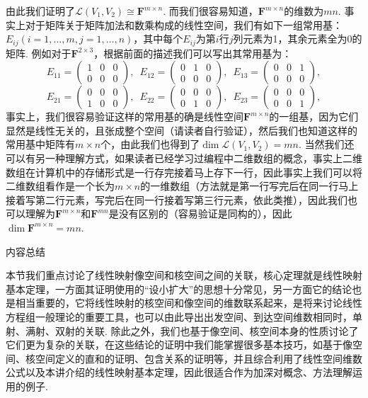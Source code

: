 由此我们证明了$\mathcal{L}(V_1,V_2)\cong\mathbf{F}^{m\times n}$. 而我们很容易知道，$\mathbf{F}^{m\times n}$的维数为$mn$. 事实上对于矩阵关于矩阵加法和数乘构成的线性空间，我们有如下一组常用基：$E_{ij}(i=1,\ldots,m,j=1,\ldots,n)$，其中每个$E_{ij}$为第$i$行$j$列元素为1，其余元素全为0的矩阵. 例如对于$\mathbf{F}^{2\times 3}$，根据前面的描述我们可以写出其常用基为：
\[E_{11}=\begin{pmatrix}
        1 & 0 & 0 \\
        0 & 0 & 0
    \end{pmatrix},\enspace E_{12}=\begin{pmatrix}
        0 & 1 & 0 \\
        0 & 0 & 0
    \end{pmatrix},\enspace E_{13}=\begin{pmatrix}
        0 & 0 & 1 \\
        0 & 0 & 0
    \end{pmatrix},\]
\[E_{21}=\begin{pmatrix}
        0 & 0 & 0 \\
        1 & 0 & 0
    \end{pmatrix},\enspace E_{22}=\begin{pmatrix}
        0 & 0 & 0 \\
        0 & 1 & 0
    \end{pmatrix},\enspace E_{23}=\begin{pmatrix}
        0 & 0 & 0 \\
        0 & 0 & 1
    \end{pmatrix},\]
事实上，我们很容易验证这样的常用基的确是线性空间$\mathbf{F}^{m\times n}$的一组基，因为它们显然是线性无关的，且张成整个空间（请读者自行验证），然后我们也知道这样的常用基中矩阵有$m\times n$个，由此我们也得到了$\dim\mathcal{L}(V_1,V_2)=mn$. 当然我们还可以有另一种理解方式，如果读者已经学习过编程中二维数组的概念，事实上二维数组在计算机中的存储形式是一行存完接着马上存下一行，因此事实上我们可以将二维数组看作是一个长为$m\times n$的一维数组（方法就是第一行写完后在同一行马上接着写第二行元素，写完后在同一行接着写第三行元素，依此类推），因此我们也可以理解为$\mathbf{F}^{m\times n}$和$\mathbf{F}^{mn}$是没有区别的（容易验证是同构的），因此$\dim\mathbf{F}^{m\times n}=mn$.

\vspace{2ex}
\centerline{\heiti \Large 内容总结}

本节我们重点讨论了线性映射像空间和核空间之间的关联，核心定理就是线性映射基本定理，一方面其证明使用的``设小扩大''的思想十分常见，另一方面它的结论也是相当重要的，它将线性映射的核空间和像空间的维数联系起来，是将来讨论线性方程组一般理论的重要工具，也可以由此导出出发空间、到达空间维数相同时，单射、满射、双射的关联. 除此之外，我们也基于像空间、核空间本身的性质讨论了它们更为复杂的关联，在这些结论的证明中我们能掌握很多基本技巧，如基于像空间、核空间定义的直和的证明、包含关系的证明等，并且综合利用了线性空间维数公式以及本讲介绍的线性映射基本定理，因此很适合作为加深对概念、方法理解运用的例子.

